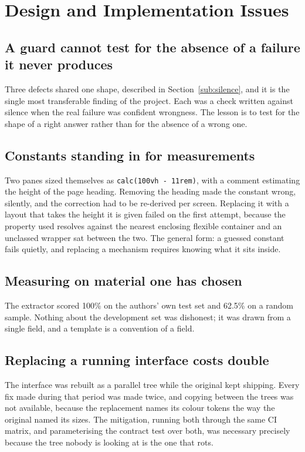 \documentclass[12pt,a4paper]{report}
\begin{document}
\section{Design and Implementation Issues}

\subsection{A guard cannot test for the absence of a failure it never produces}

Three defects shared one shape, described in Section~\ref{sub:silence}, and it is the
single most transferable finding of the project. Each was a check written
against silence when the real failure was confident wrongness. The lesson is to
test for the shape of a right answer rather than for the absence of a wrong one.

\subsection{Constants standing in for measurements}

Two panes sized themselves as \texttt{calc(100vh - 11rem)}, with a comment
estimating the height of the page heading. Removing the heading made the
constant wrong, silently, and the correction had to be re-derived per screen.
Replacing it with a layout that takes the height it is given failed on the first
attempt, because the property used resolves against the nearest enclosing
flexible container and an unclassed wrapper sat between the two. The general
form: a guessed constant fails quietly, and replacing a mechanism requires
knowing what it sits inside.

\subsection{Measuring on material one has chosen}

The extractor scored 100\% on the authors' own test set and 62.5\% on a random
sample. Nothing about the development set was dishonest; it was drawn from a
single field, and a template is a convention of a field.

\subsection{Replacing a running interface costs double}

The interface was rebuilt as a parallel tree while the original kept shipping.
Every fix made during that period was made twice, and copying between the trees
was not available, because the replacement names its colour tokens the way the
original named its sizes. The mitigation, running both through the same CI
matrix, and parameterising the contract test over both, was necessary
precisely because the tree nobody is looking at is the one that rots.
\end{document}

